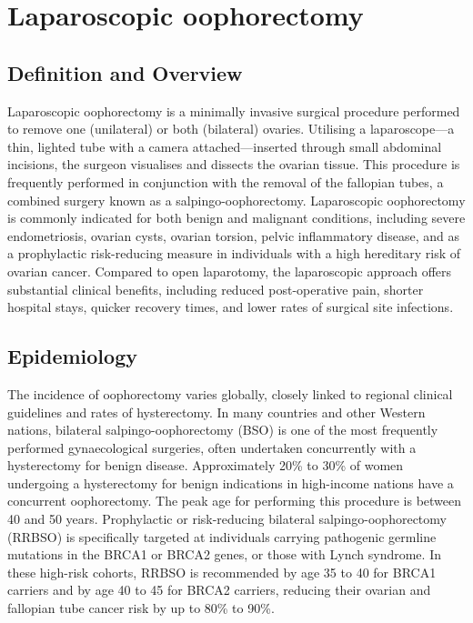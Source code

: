 \chapter{Laparoscopic oophorectomy}

\section*{Definition and Overview}
Laparoscopic oophorectomy is a minimally invasive surgical procedure performed to remove one (unilateral) or both (bilateral) ovaries. Utilising a laparoscope---a thin, lighted tube with a camera attached---inserted through small abdominal incisions, the surgeon visualises and dissects the ovarian tissue. This procedure is frequently performed in conjunction with the removal of the fallopian tubes, a combined surgery known as a salpingo-oophorectomy. Laparoscopic oophorectomy is commonly indicated for both benign and malignant conditions, including severe endometriosis, ovarian cysts, ovarian torsion, pelvic inflammatory disease, and as a prophylactic risk-reducing measure in individuals with a high hereditary risk of ovarian cancer. Compared to open laparotomy, the laparoscopic approach offers substantial clinical benefits, including reduced post-operative pain, shorter hospital stays, quicker recovery times, and lower rates of surgical site infections.

\section*{Epidemiology}
The incidence of oophorectomy varies globally, closely linked to regional clinical guidelines and rates of hysterectomy. In many countries and other Western nations, bilateral salpingo-oophorectomy (BSO) is one of the most frequently performed gynaecological surgeries, often undertaken concurrently with a hysterectomy for benign disease. Approximately 20\% to 30\% of women undergoing a hysterectomy for benign indications in high-income nations have a concurrent oophorectomy. The peak age for performing this procedure is between 40 and 50 years. Prophylactic or risk-reducing bilateral salpingo-oophorectomy (RRBSO) is specifically targeted at individuals carrying pathogenic germline mutations in the BRCA1 or BRCA2 genes, or those with Lynch syndrome. In these high-risk cohorts, RRBSO is recommended by age 35 to 40 for BRCA1 carriers and by age 40 to 45 for BRCA2 carriers, reducing their ovarian and fallopian tube cancer risk by up to 80\% to 90\%.

